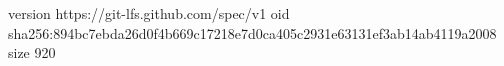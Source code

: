 version https://git-lfs.github.com/spec/v1
oid sha256:894bc7ebda26d0f4b669c17218e7d0ca405c2931e63131ef3ab14ab4119a2008
size 920
